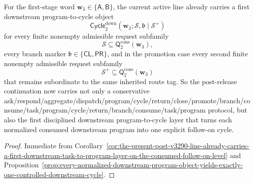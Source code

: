 \begin{corollary}
\label{cor:the-present-post-v3290-line-already-carries-a-first-downstream-program-to-cycle-layer-on-the-consumed-follow-on-level}
For the first-stage word \(\mathbf w_3\in\{\mathsf A,\mathsf B\}\), the current active line already carries a first downstream program-to-cycle object
\[
 \mathsf{Cycle}^{\mathrm{down}}_{2}(\mathbf w_3;\mathcal S,\mathfrak b\mid\mathcal S^{+})
\]
for every finite nonempty admissible request subfamily
\[
 \mathcal S\subseteq \mathsf{Q}^{\mathrm{cons}}_{2}(\mathbf w_3),
\]
every branch marker \(\mathfrak b\in\{\mathsf{CL},\mathsf{PR}\}\), and in the promotion case every second finite nonempty admissible request subfamily
\[
 \mathcal S^{+}\subseteq \mathsf{Q}^{\mathrm{cons}}_{2}(\mathbf w_3)
\]
that remains subordinate to the same inherited route tag. So the post-release continuation now carries not only a conservative ask/\allowbreak{}respond/\allowbreak{}aggregate/\allowbreak{}dispatch/\allowbreak{}program/\allowbreak{}cycle/\allowbreak{}return/\allowbreak{}close/\allowbreak{}promote/\allowbreak{}branch/\allowbreak{}consume/\allowbreak{}task/\allowbreak{}program/\allowbreak{}cycle/\allowbreak{}return/\allowbreak{}branch/\allowbreak{}consume/\allowbreak{}task/\allowbreak{}program protocol, but also the first disciplined downstream program-to-cycle layer that turns each normalized consumed downstream program into one explicit follow-on cycle.
\end{corollary}

\begin{proof}
Immediate from Corollary~\ref{cor:the-present-post-v3290-line-already-carries-a-first-downstream-task-to-program-layer-on-the-consumed-follow-on-level} and Proposition~\ref{prop:every-normalized-downstream-program-object-yields-exactly-one-controlled-downstream-cycle}.
\end{proof}

